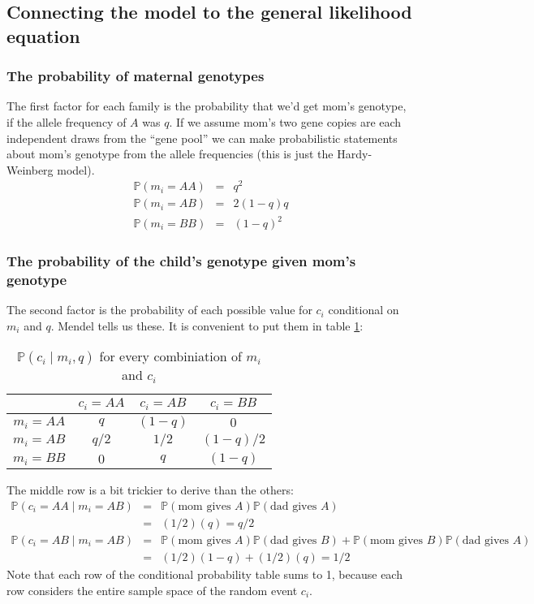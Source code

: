 \documentclass[11pt]{article}
\renewcommand{\Pr}{\mathbb{P}}
\begin{document}
\subsection{Connecting the model to the general likelihood equation}
\subsubsection{The probability of maternal genotypes}
The first factor for each family is the probability that we'd get mom's genotype, if
the allele frequency of $A$ was $q$.
If we assume mom's two gene copies are each independent draws from the ``gene pool'' we can 
make probabilistic statements about mom's genotype from the allele frequencies (this 
is just the Hardy-Weinberg model).
\begin{eqnarray}
  \Pr(m_i = AA) & = & q^2 \\
  \Pr(m_i = AB) & = & 2(1-q) q \\
  \Pr(m_i = BB) & = & \left(1 - q\right)^2
\end{eqnarray}

\subsubsection{The probability of the child's genotype given mom's genotype}
The second factor is the probability of each possible value for $c_i$ conditional on $m_i$ and
$q$.
Mendel tells us these.
It is convenient to put them in table \ref{childCond}:\\
\begin{table}[h!]
\begin{tabular}{|c|c|c|c|}
\hline
         & $c_i = AA$ & $c_i = AB$ & $c_i = BB$ \\
\hline 
$m_i=AA$ & $ q$                     & $(1-q)$                 &  $0$ \\
$m_i=AB$ & $q/2$                     & $1/2$                 &  $(1-q)/2$ \\
$m_i=BB$ & $0$                     & $q$                 &  $(1-q)$ \\
\hline
\end{tabular}
\caption{$\Pr(c_i\mid m_i, q)$ for every combiniation of $m_i$ and $c_i$}\label{childCond}
\end{table}


The middle row is a bit trickier to derive than the others:
\begin{eqnarray}
  \Pr(c_i = AA \mid m_i = AB) & = & \Pr(\mbox{mom gives }A)\Pr(\mbox{dad gives }A) \nonumber \\
  & = & (1/2)(q) = q/2 \\
  \Pr(c_i = AB \mid m_i = AB) & = & \Pr(\mbox{mom gives }A)\Pr(\mbox{dad gives }B) + \Pr(\mbox{mom gives }B)\Pr(\mbox{dad gives }A) \nonumber \\
  & = & (1/2)(1-q) + (1/2)(q) = 1/2
\end{eqnarray}
Note that each row of the conditional probability table sums to 1, because each
row considers the entire sample space of the random event $c_i$.
\end{document}
